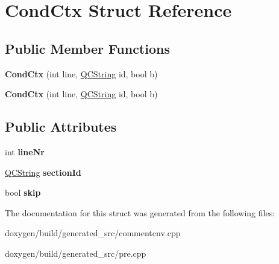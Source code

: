 \hypertarget{struct_cond_ctx}{}\section{Cond\+Ctx Struct Reference}
\label{struct_cond_ctx}
\subsection*{Public Member Functions}
\begin{DoxyCompactItemize}
\item 
\mbox{\label{struct_cond_ctx_a7a6037a965f2f6a82960b7c7382be0ad}} 
{\bfseries Cond\+Ctx} (int line, \mbox{\hyperlink{class_q_c_string}{Q\+C\+String}} id, bool b)
\item 
\mbox{\label{struct_cond_ctx_a7a6037a965f2f6a82960b7c7382be0ad}} 
{\bfseries Cond\+Ctx} (int line, \mbox{\hyperlink{class_q_c_string}{Q\+C\+String}} id, bool b)
\end{DoxyCompactItemize}
\subsection*{Public Attributes}
\begin{DoxyCompactItemize}
\item 
\mbox{\label{struct_cond_ctx_a0fc852aa8a57648a0d522ccc0439b805}} 
int {\bfseries line\+Nr}
\item 
\mbox{\label{struct_cond_ctx_ab034cbd93815154c39688dd4bcf1fa35}} 
\mbox{\hyperlink{class_q_c_string}{Q\+C\+String}} {\bfseries section\+Id}
\item 
\mbox{\label{struct_cond_ctx_a6391224b6536dcd33117f3220f1cb01b}} 
bool {\bfseries skip}
\end{DoxyCompactItemize}


The documentation for this struct was generated from the following files\+:\begin{DoxyCompactItemize}
\item 
doxygen/build/generated\+\_\+src/commentcnv.\+cpp\item 
doxygen/build/generated\+\_\+src/pre.\+cpp\end{DoxyCompactItemize}
